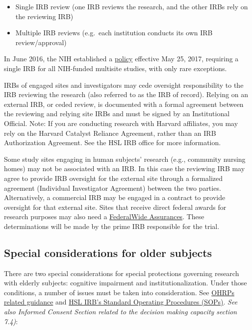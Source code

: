 \documentclass[]{book}
\providecommand{\tightlist}{%
  \setlength{\itemsep}{0pt}\setlength{\parskip}{0pt}}
\begin{document}
\begin{itemize}
\tightlist
\item
  Single IRB review (one IRB reviews the research, and the other IRBs
  rely on the reviewing IRB)
\item
  Multiple IRB reviews (e.g.~each institution conducts its own IRB
  review/approval)
\end{itemize}

In June 2016, the NIH established a
\href{http://grants.nih.gov/grants/guide/notice-files/NOT-OD-16-094.html}{policy}
effective May 25, 2017, requiring a single IRB for all NIH-funded
multisite studies, with only rare exceptions.

IRBs of engaged sites and investigators may cede oversight
responsibility to the IRB reviewing the research (also referred to as
the IRB of record). Relying on an external IRB, or ceded review, is
documented with a formal agreement between the reviewing and relying
site IRBs and must be signed by an Institutional Official. Note: If you
are conducting research with Harvard affiliates, you may rely on the
Harvard Catalyst Reliance Agreement, rather than an IRB Authorization
Agreement. See the HSL IRB office for more information.

Some study sites engaging in human subjects' research (e.g., community
nursing homes) may not be associated with an IRB. In this case the
reviewing IRB may agree to provide IRB oversight for the external site
through a formalized agreement (Individual Investigator Agreement)
between the two parties. Alternatively, a commercial IRB may be engaged
in a contract to provide oversight for that external site. Sites that
receive direct federal awards for research purposes may also need a
\href{http://www.hhs.gov/ohrp/register-irbs-and-obtain-fwas/fwas/fwa-protection-of-human-subjecct/index.html}{FederalWide
Assurances}. These determinations will be made by the prime IRB
responsible for the trial.

\subsection{Special considerations for older
subjects}\label{special-considerations-for-older-subjects}

There are two special considerations for special protections governing
research with elderly subjects: cognitive impairment and
institutionalization. Under those conditions, a number of issues must be
taken into consideration. See
\href{http://archive.hhs.gov/ohrp/irb/irb_chapter6.htm}{OHRPs related
guidance} and
\href{http://thehslhub/~/media/HSLNet/Docs/IFAR/IRB/IRB_SOP.ashx}{HSL
IRB's Standard Operating Procedures (SOPs)}. \emph{See also Informed
Consent Section related to the decision making capacity section 7.4)}:
\end{document}
